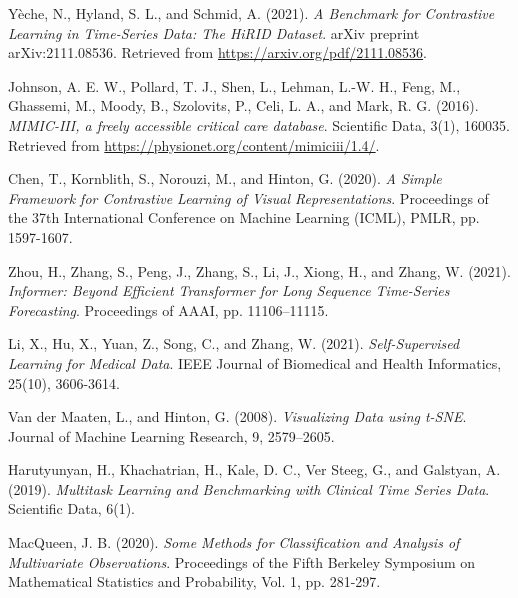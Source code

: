\documentclass[twocolumn]{article}
\begin{document}
    \begin{thebibliography}{9}
         Yèche, N., Hyland, S. L., and Schmid, A. (2021). \textit{A
            Benchmark for Contrastive Learning in Time-Series Data: The HiRID Dataset}.
            arXiv preprint arXiv:2111.08536. Retrieved from
            \url{https://arxiv.org/pdf/2111.08536}.

         Johnson, A. E. W., Pollard, T. J., Shen, L., Lehman,
            L.-W. H., Feng, M., Ghassemi, M., Moody, B., Szolovits, P., Celi, L.
            A., and Mark, R. G. (2016). \textit{MIMIC-III, a freely accessible critical
            care database}. Scientific Data, 3(1), 160035. Retrieved from \url{https://physionet.org/content/mimiciii/1.4/}.

         Chen, T., Kornblith, S., Norouzi, M., and Hinton, G.
            (2020). \textit{A Simple Framework for Contrastive Learning of
            Visual Representations}. Proceedings of the 37th International Conference
            on Machine Learning (ICML), PMLR, pp. 1597-1607.

         Zhou, H., Zhang, S., Peng, J., Zhang, S., Li, J.,
            Xiong, H., and Zhang, W. (2021). \textit{Informer: Beyond Efficient Transformer
            for Long Sequence Time-Series Forecasting}. Proceedings of AAAI, pp.
            11106–11115.

         Li, X., Hu, X., Yuan, Z., Song, C., and Zhang, W. (2021).
            \textit{Self-Supervised Learning for Medical Data}. IEEE Journal of
            Biomedical and Health Informatics, 25(10), 3606-3614.

         Van der Maaten, L., and Hinton, G. (2008). \textit{Visualizing
            Data using t-SNE}. Journal of Machine Learning Research, 9, 2579–2605.

         Harutyunyan, H., Khachatrian, H., Kale, D. C.,
            Ver Steeg, G., and Galstyan, A. (2019). \textit{Multitask Learning
            and Benchmarking with Clinical Time Series Data}. Scientific Data, 6(1).

         MacQueen, J. B. (2020). \textit{Some Methods for
            Classification and Analysis of Multivariate Observations}. Proceedings
            of the Fifth Berkeley Symposium on Mathematical Statistics and Probability,
            Vol. 1, pp. 281-297.
    \end{thebibliography}
\end{document}
